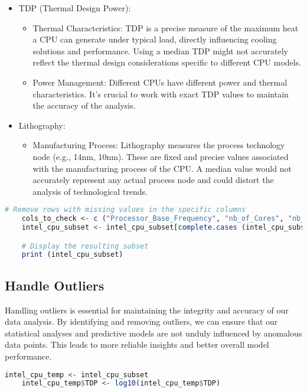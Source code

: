 \begin{itemize}
    \item TDP (Thermal Design Power):
    \begin{itemize}
        \item Thermal Characteristics: TDP is a precise measure of the maximum heat a CPU can generate under typical load, directly influencing cooling solutions and performance. Using a median TDP might not accurately reflect the thermal design considerations specific to different CPU models.
        \item Power Management: Different CPUs have different power and thermal characteristics. It's crucial to work with exact TDP values to maintain the accuracy of the analysis.
    \end{itemize}

    \item Lithography:
    \begin{itemize}
        \item Manufacturing Process: Lithography measures the process technology node (e.g., 14nm, 10nm). These are fixed and precise values associated with the manufacturing process of the CPU. A median value would not accurately represent any actual process node and could distort the analysis of technological trends.
    \end{itemize}
\end{itemize}

\begin{lstlisting}[language=R]
    # Remove rows with missing values in the specific columns
    cols_to_check <- c ("Processor_Base_Frequency", "nb_of_Cores", "nb_of_Threads", "TDP", "Lithography")
    intel_cpu_subset <- intel_cpu_subset[complete.cases (intel_cpu_subset[, cols_to_check]), ]

    # Display the resulting subset
    print (intel_cpu_subset)
\end{lstlisting}

\subsection{Handle Outliers}
Handling outliers is essential for maintaining the integrity and accuracy of our data analysis. By identifying and removing outliers, we can ensure that our statistical analyses and predictive models are not unduly influenced by anomalous data points. This leads to more reliable insights and better overall model performance.

\begin{lstlisting}[language=R]
    intel_cpu_temp <- intel_cpu_subset
    intel_cpu_temp$TDP <- log10(intel_cpu_temp$TDP)
\end{lstlisting}

\newpage